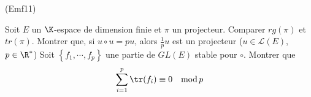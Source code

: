 \begin{tiny}(Emf11)\end{tiny}
Soit $E$ un $\K$-espace de dimension finie et $\pi $ un projecteur. Comparer $rg(\pi )$ et $tr(\pi )$.\newline
Montrer que, si $u\circ u=pu$, alors $\frac{1}{p}u$ est un projecteur ($u\in\mathcal{L}(E)$, $p\in \R^{*}$)\newline
Soit $\left\{ f_{1},\cdots ,f_{p}\right\} $ une partie de $GL(E)$ stable pour $\circ $. Montrer que
\begin{displaymath}
 \sum_{i=1}^{p}\tr(f_{i})\equiv 0 \quad \mathrm{mod}\,p
\end{displaymath}
